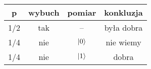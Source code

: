 \documentclass[12pt,a4paper]{standalone}
\begin{document}
\begin{tabular}{c|c|c|c}
p &wybuch & pomiar & konkluzja \\ \hline
1/2 & tak & -- & była dobra\\
1/4 & nie & $\ket{0}$ & nie wiemy\\
1/4 & nie & $\ket{1}$ & dobra
\end{tabular}
\end{document}
